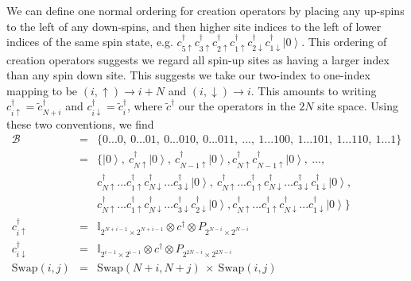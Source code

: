 \documentclass{article}
\newcommand{\ket}[1]{\left| #1 \right>} %
\theoremstyle{definition}
\begin{document}
We can define one normal ordering for creation operators by placing any up-spins to the left of any down-spins, and then higher site indices to the left of lower indices of the same spin state, e.g. $c^\dag_{5\uparrow}c^\dag_{3\uparrow}c^\dag_{2\uparrow}c^\dag_{1\uparrow}c^\dag_{2\downarrow}c^\dag_{1\downarrow} \ket{0}$. This ordering of creation operators suggests we regard all spin-up sites as having a larger index than any spin down site. This suggests we take our two-index to one-index mapping to be $(i, \uparrow) \rightarrow i + N$ and $(i, \downarrow) \rightarrow i$. This amounts to writing $c^\dag_{i\uparrow} = \tilde c^\dag_{N+i}$ and $c^\dag_{i\downarrow} = \tilde c^\dag_i$, where $\tilde c^\dag$ our the operators in the $2N$ site space. Using these two conventions, we find
\begin{eqnarray}
\mathcal{B} &=& \{0...0, \ 0...01, \ 0...010, \ 0...011, \ ..., \ 1...100, \ 1...101, \ 1...110, \ 1...1 \}\\
&=& \{\ket{0},\ c^\dag_{N\uparrow} \ket{0}, \ c^\dag_{N-1\uparrow} \ket{0}, c^\dag_{N\uparrow} c^\dag_{N-1\uparrow} \ket{0},\ ...,\\
&& c^\dag_{N\uparrow}...c^\dag_{1\uparrow}c^\dag_{N\downarrow}...c^\dag_{3\downarrow} \ket{0},\ c^\dag_{N\uparrow}...c^\dag_{1\uparrow}c^\dag_{N\downarrow}...c^\dag_{3\downarrow} c^\dag_{1\downarrow} \ket{0}, \nonumber \\
&& c^\dag_{N\uparrow}...c^\dag_{1\uparrow}c^\dag_{N\downarrow}...c^\dag_{3\downarrow}c^\dag_{2\downarrow} \ket{0}, c^\dag_{N\uparrow}...c^\dag_{1\uparrow}c^\dag_{N\downarrow}...c^\dag_{1\downarrow} \ket{0} \} \nonumber \\
c^\dag_{i\uparrow} &=& \mathbb{I}_{2^{N+i-1}\times2^{N+i-1}}\otimes c^\dag \otimes P_{2^{N-i}\times2^{N-i}}\\
c^\dag_{i\downarrow} &=& \mathbb{I}_{2^{i-1}\times2^{i-1}} \otimes c^\dag \otimes P_{2^{2N-i}\times2^{2N-i}}\\
\text{Swap}(i,j) &=&\text{Swap}(N+i,N+j) \ \times \ \text{Swap}(i,j)
\end{eqnarray}
\end{document}
